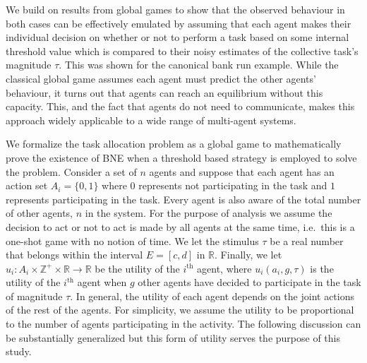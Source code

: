 \documentclass{nature}
\def\Z{\mathbb{Z}}    %
\def\R{\mathbb{R}}    %
\begin{document}
We build on results from global games\cite{Carlsson1993} to show that the observed behaviour in both cases can be effectively emulated by assuming that each agent makes their individual decision on whether or not to perform a task based on some internal threshold value which is compared to their noisy estimates of the collective task's magnitude $\tau$. This was shown for the canonical bank run example\cite{Morris2000}. While the classical global game assumes each agent must predict the other agents' behaviour, it turns out that agents can reach an equilibrium without this capacity. This, and the fact that agents do not need to communicate, makes this approach widely applicable to a wide range of multi-agent systems.

We formalize the task allocation problem as a global game to mathematically prove the existence of BNE when a threshold based strategy is employed to solve the problem. Consider a set of $n$ agents and suppose that each agent has an action set $A_i=\{0,1\}$ where $0$ represents not participating in the task and $1$ represents participating in the task. Every agent is also aware of the total number of other agents, $n$ in the system. For the purpose of analysis we assume the decision to act or not to act is made by all agents at the same time, i.e.\ this is a one-shot game with no notion of time. 
We let the stimulus $\tau$ be a real number that belongs within the interval $E=[c,d]$ in $\R$. Finally, we let $u_i:A_i\times\Z^+\times \R\to \R$ be the utility of the $i^{\text{th}}$ agent, where $u_i(a_i,g,\tau)$ is the utility of the $i^{\text{th}}$ agent when $g$ other agents have decided to participate in the task of magnitude $\tau$. In general, the utility of each agent depends on the joint actions of the rest of the agents. For simplicity, we assume the utility to be proportional to the number of agents participating in the activity. The following discussion can be substantially generalized but this form of utility serves the purpose of this study. 
\end{document}

